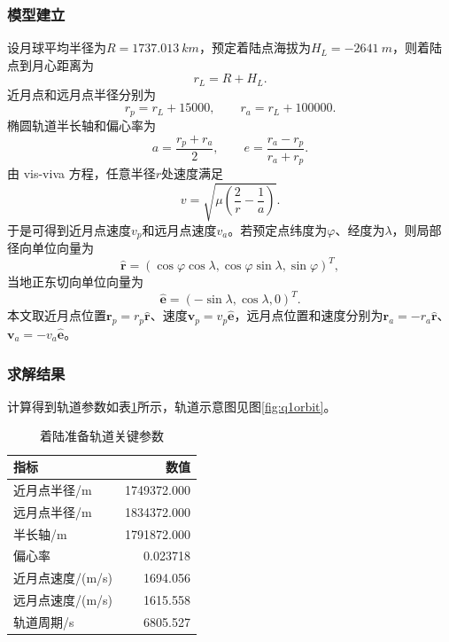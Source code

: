 \documentclass[UTF8,a4paper,12pt]{ctexart}
\begin{document}
\subsubsection{模型建立}
设月球平均半径为$R=\SI{1737.013}{km}$，预定着陆点海拔为$H_L=\SI{-2641}{m}$，则着陆点到月心距离为
\begin{equation}
 r_L=R+H_L.
\end{equation}
近月点和远月点半径分别为
\begin{equation}
 r_p=r_L+15000,\qquad r_a=r_L+100000.
\end{equation}
椭圆轨道半长轴和偏心率为
\begin{equation}
 a=\frac{r_p+r_a}{2},\qquad e=\frac{r_a-r_p}{r_a+r_p}.
\end{equation}
由 vis-viva 方程，任意半径$r$处速度满足
\begin{equation}
 v=\sqrt{\mu\left(\frac{2}{r}-\frac{1}{a}\right)}.
\end{equation}
于是可得到近月点速度$v_p$和远月点速度$v_a$。若预定点纬度为$\varphi$、经度为$\lambda$，则局部径向单位向量为
\begin{equation}
\hat{\bm r}=(\cos\varphi\cos\lambda,\cos\varphi\sin\lambda,\sin\varphi)^T,
\end{equation}
当地正东切向单位向量为
\begin{equation}
\hat{\bm e}=(-\sin\lambda,\cos\lambda,0)^T.
\end{equation}
本文取近月点位置$\bm r_p=r_p\hat{\bm r}$、速度$\bm v_p=v_p\hat{\bm e}$，远月点位置和速度分别为$\bm r_a=-r_a\hat{\bm r}$、$\bm v_a=-v_a\hat{\bm e}$。

\subsubsection{求解结果}
计算得到轨道参数如表\ref{tab:q1}所示，轨道示意图见图\ref{fig:q1orbit}。

\begin{table}[H]
\centering
\caption{着陆准备轨道关键参数}
\label{tab:q1}
\begin{tabular}{lr}
\toprule
指标 & 数值 \\
\midrule
近月点半径/m & 1749372.000 \\
远月点半径/m & 1834372.000 \\
半长轴/m & 1791872.000 \\
偏心率 & 0.023718 \\
近月点速度/(m/s) & 1694.056 \\
远月点速度/(m/s) & 1615.558 \\
轨道周期/s & 6805.527 \\
\bottomrule
\end{tabular}
\end{table}
\end{document}

